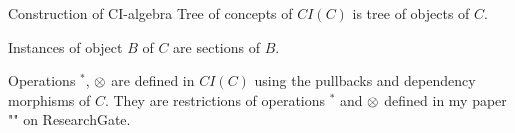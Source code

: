 \begin{frame}{Construction of CI-algebra}
Tree of concepts of $CI(C)$ is tree of objects of $C$.

Instances of object $B$ of $C$ are sections of $B$. 

Operations $^*$, $\otimes$ are defined in $CI(C)$ using the pullbacks and dependency morphisms of $C$.  
 They are restrictions of  operations $^*$ and $\otimes$ defined in my paper
 "" on ResearchGate.
\end{frame}